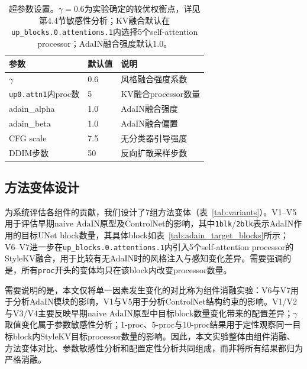 \documentclass[10pt,twocolumn]{article}
\begin{document}
\begin{table}[htbp]
  \centering
  \caption{超参数设置。$\gamma=0.6$为实验确定的较优权衡点，详见第4.4节敏感性分析；KV融合默认在\texttt{up\_blocks.0.attentions.1}内选择5个self-attention processor；AdaIN融合强度默认1.0。}
  \label{tab:hyperparams}
  \small
  \begin{tabular}{lll}
    \toprule
    参数 & 默认值 & 说明 \\
    \midrule
    $\gamma$ & 0.6 & 风格融合强度系数 \\
    \texttt{up0.attn1}内proc数 & 5 & KV融合processor数量 \\
    adain\_alpha & 1.0 & AdaIN融合强度 \\
    adain\_beta  & 1.0 & AdaIN融合偏置 \\
    CFG scale & 7.5 & 无分类器引导强度 \\
    DDIM步数 & 50 & 反向扩散采样步数 \\
    \bottomrule
  \end{tabular}
\end{table}

\subsection{方法变体设计}

为系统评估各组件的贡献，我们设计了7组方法变体（表~\ref{tab:variants}）。V1--V5用于评估早期naive AdaIN原型及ControlNet的影响，其中\texttt{1blk}/\texttt{2blk}表示AdaIN作用的目标UNet block数量，其具体block如表~\ref{tab:adain_target_blocks}所示；V6--V7进一步在\texttt{up\_blocks.0.attentions.1}内引入5个self-attention processor的StyleKV融合，用于比较有无AdaIN时的风格注入与感知变化差异。需要强调的是，所有\texttt{proc}开头的变体均只在该block内改变processor数量。

需要说明的是，本文仅将单一因素发生变化的对比称为组件消融实验：V6与V7用于分析AdaIN模块的影响，V1与V5用于分析ControlNet结构约束的影响。V1/V2与V3/V4主要反映早期naive AdaIN原型中目标block数量变化带来的配置差异；$\gamma$取值变化属于参数敏感性分析；1-proc、5-proc与10-proc结果用于定性观察同一目标block内StyleKV目标processor数量的影响。因此，本文实验整体由组件消融、方法变体对比、参数敏感性分析和配置定性分析共同组成，而非将所有结果都归为严格消融。
\end{document}

